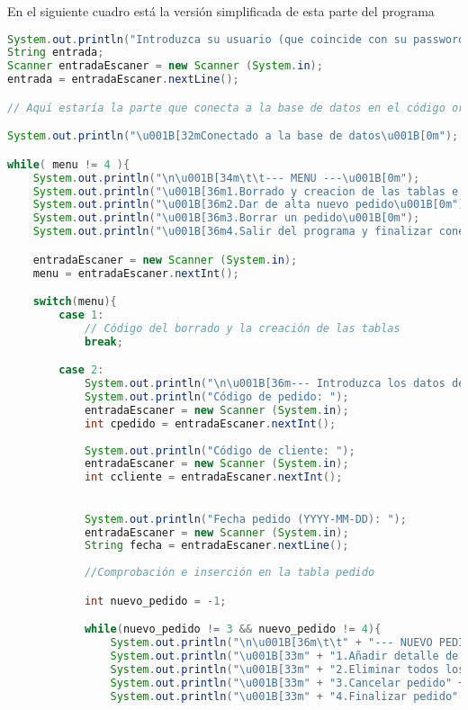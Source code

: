 En el siguiente cuadro está la versión simplificada de esta parte del programa
\begin{lstlisting}[language=Java]
System.out.println("Introduzca su usuario (que coincide con su password): ");
String entrada;	
Scanner entradaEscaner = new Scanner (System.in);
entrada = entradaEscaner.nextLine();

// Aquí estaría la parte que conecta a la base de datos en el código original

System.out.println("\u001B[32mConectado a la base de datos\u001B[0m");

while( menu != 4 ){
	System.out.println("\n\u001B[34m\t\t--- MENU ---\u001B[0m");
	System.out.println("\u001B[36m1.Borrado y creacion de las tablas e insercion de tuplas\u001B[0m");
	System.out.println("\u001B[36m2.Dar de alta nuevo pedido\u001B[0m");
	System.out.println("\u001B[36m3.Borrar un pedido\u001B[0m");
	System.out.println("\u001B[36m4.Salir del programa y finalizar conexion\u001B[0m");

	entradaEscaner = new Scanner (System.in);
	menu = entradaEscaner.nextInt();

	switch(menu){
		case 1:
			// Código del borrado y la creación de las tablas
			break;

		case 2:
			System.out.println("\n\u001B[36m--- Introduzca los datos del pedido ---\u001B[0m");
			System.out.println("Código de pedido: ");
			entradaEscaner = new Scanner (System.in);
			int cpedido = entradaEscaner.nextInt();
	
			System.out.println("Código de cliente: ");
			entradaEscaner = new Scanner (System.in);
			int ccliente = entradaEscaner.nextInt();

			
			System.out.println("Fecha pedido (YYYY-MM-DD): ");
			entradaEscaner = new Scanner (System.in);
			String fecha = entradaEscaner.nextLine();
					  	
			//Comprobación e inserción en la tabla pedido

			int nuevo_pedido = -1;

			while(nuevo_pedido != 3 && nuevo_pedido != 4){
				System.out.println("\n\u001B[36m\t\t" + "--- NUEVO PEDIDO ---" + "\u001B[0m");
				System.out.println("\u001B[33m" + "1.Añadir detalle de producto" + "\u001B[0m");
				System.out.println("\u001B[33m" + "2.Eliminar todos los detalles de producto" + "\u001B[0m");
				System.out.println("\u001B[33m" + "3.Cancelar pedido" + "\u001B[0m");
				System.out.println("\u001B[33m" + "4.Finalizar pedido" + "\u001B[0m");


\end{lstlisting}
